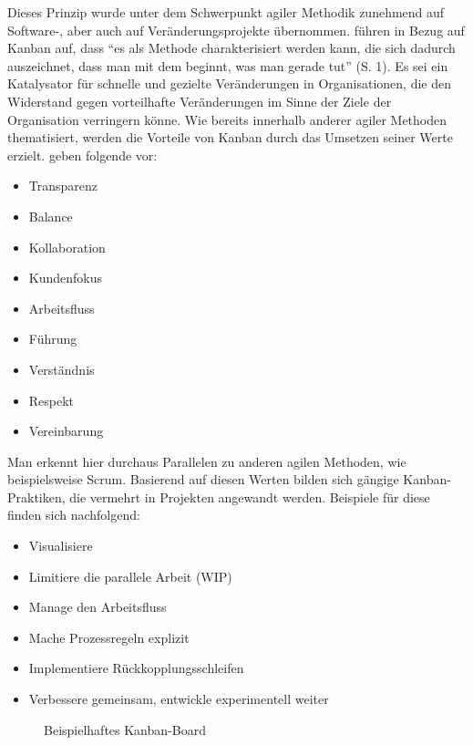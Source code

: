 Dieses Prinzip wurde unter dem Schwerpunkt agiler Methodik zunehmend auf Software-, aber auch auf Veränderungsprojekte übernommen.  führen in Bezug auf Kanban auf, dass ``es als Methode charakterisiert werden kann, die sich dadurch auszeichnet, dass man mit dem beginnt, was man gerade tut'' (S. 1). Es sei ein Katalysator für schnelle und gezielte
Veränderungen in Organisationen, die den Widerstand gegen vorteilhafte Veränderungen im Sinne der Ziele der Organisation verringern könne. Wie bereits innerhalb anderer agiler Methoden thematisiert, werden die Vorteile von Kanban durch das Umsetzen seiner Werte erzielt.  geben folgende vor:

\begin{itemize}[noitemsep, topsep=0pt]
	\item Transparenz
	\item Balance
	\item Kollaboration
	\item Kundenfokus
	\item Arbeitsfluss
	\item Führung
	\item Verständnis
	\item Respekt
	\item Vereinbarung
\end{itemize}

Man erkennt hier durchaus Parallelen zu anderen agilen Methoden, wie beispielsweise Scrum. Basierend auf diesen Werten bilden sich gängige Kanban-Praktiken, die vermehrt in Projekten angewandt werden. Beispiele für diese finden sich nachfolgend:

\begin{itemize}[noitemsep, topsep=0pt]
	\item Visualisiere
	\item Limitiere die parallele Arbeit (WIP)
	\item Manage den Arbeitsfluss
	\item Mache Prozessregeln explizit
	\item Implementiere Rückkopplungsschleifen
	\item Verbessere gemeinsam, entwickle experimentell weiter
\end{itemize}

\begin{figure}[H]
	\centering
	\caption[Beispielhaftes Kanban-Board]{Beispielhaftes Kanban-Board \protect \cite[S. 15]{anderson_essenz_2018}}
	\label{fig:kanban}
\end{figure}

